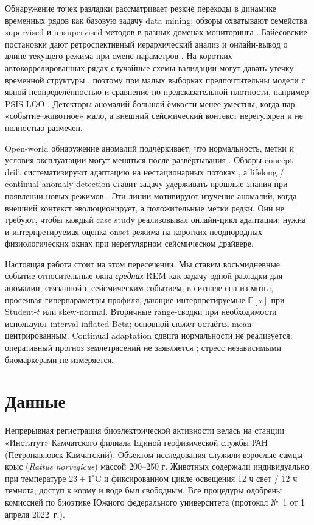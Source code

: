 Обнаружение точек разладки рассматривает резкие переходы в динамике временных рядов как базовую задачу data mining; обзоры охватывают семейства supervised и unsupervised методов в разных доменах мониторинга \cite{Aminikhanghahi2017}. Байесовские постановки дают ретроспективный иерархический анализ \cite{carlin1992hierarchical} и онлайн-вывод о длине текущего режима при смене параметров \cite{Adams2007}. На коротких автокоррелированных рядах \cite{Hyndman2018} случайные схемы валидации могут давать утечку временной структуры \cite{Bergmeir2012}, поэтому при малых выборках предпочтительны модели с явной неопределённостью \cite{Sinkovec2022} и сравнение по предсказательной плотности, например PSIS-LOO \cite{Vehtari2017}. Детекторы аномалий большой ёмкости менее уместны, когда пар «событие–животное» мало, а внешний сейсмический контекст нерегулярен и не полностью размечен.

Open-world обнаружение аномалий подчёркивает, что нормальность, метки и условия эксплуатации могут меняться после развёртывания \cite{Chandola2009,Han2023}. Обзоры concept drift систематизируют адаптацию на нестационарных потоках \cite{Gama2014}, а lifelong / continual anomaly detection ставит задачу удерживать прошлые знания при появлении новых режимов \cite{Faber2024}. Эти линии мотивируют изучение аномалий, когда внешний контекст эволюционирует, а положительные метки редки. Они не требуют, чтобы каждый case study реализовывал онлайн-цикл адаптации: нужна и интерпретируемая оценка onset режима на коротких неоднородных физиологических окнах при нерегулярном сейсмическом драйвере.

Настоящая работа стоит на этом пересечении. Мы ставим восьмидневные событие-относительные окна \emph{средних} REM как задачу одной разладки для аномалии, связанной с сейсмическим событием, в сигнале сна из мозга, просеивая гиперпараметры профиля, дающие интерпретируемые \(\mathbb{E}[\tau]\) при Student-\(t\) или skew-normal. Вторичные range-сводки при необходимости используют interval-inflated Beta; основной сюжет остаётся mean-центрированным. Continual adaptation сдвига нормальности не реализуется; оперативный прогноз землетрясений не заявляется \cite{Geller1997}; стресс независимыми биомаркерами не измеряется.

\section{Данные}

Непрерывная регистрация биоэлектрической активности велась на станции «Институт» Камчатского филиала Единой геофизической службы РАН (Петропавловск-Камчатский). Объектом исследования служили взрослые самцы крыс (\textit{Rattus norvegicus}) массой 200–250 г. Животных содержали индивидуально при температуре \(23\pm 1^{\circ}\)C и фиксированном цикле освещения 12 ч свет / 12 ч темнота; доступ к корму и воде был свободным. Все процедуры одобрены комиссией по биоэтике Южного федерального университета (протокол №~1 от 1 апреля 2022~г.).

